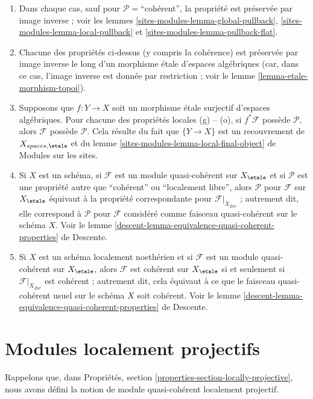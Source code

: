 \begin{enumerate}
\item Dans chaque cas, sauf pour $\mathcal{P}=$``cohérent'', la propriété
est préservée par image inverse ; voir les
lemmes \ref{sites-modules-lemma-global-pullback},
\ref{sites-modules-lemma-local-pullback} et
\ref{sites-modules-lemma-pullback-flat}.
\item Chacune des propriétés ci-dessus (y compris la cohérence) est préservée par
image inverse le long d'un morphisme \'etale d'espaces algébriques (car, dans ce
cas, l'image inverse est donnée par restriction ; voir le
lemme \ref{lemma-etale-morphism-topoi}).
\item Supposons que $f : Y \to X$ soit un morphisme \'etale surjectif d'espaces
algébriques. Pour chacune des propriétés locales (g) -- (o), si
$f^*\mathcal{F}$ possède $\mathcal{P}$, alors $\mathcal{F}$ possède
$\mathcal{P}$. Cela résulte du fait que $\{Y \to X\}$ est un recouvrement de
$X_{spaces, \etale}$ et du
lemme \ref{sites-modules-lemma-local-final-object} de Modules sur les sites.
\item Si $X$ est un schéma, si $\mathcal{F}$ est un module quasi-cohérent
sur $X_\etale$ et si $\mathcal{P}$ est une propriété autre que ``cohérent'' ou
``localement libre'', alors $\mathcal{P}$ pour $\mathcal{F}$ sur $X_\etale$
équivaut à la propriété correspondante pour
$\mathcal{F}|_{X_{Zar}}$ ; autrement dit, elle correspond à $\mathcal{P}$
pour $\mathcal{F}$ considéré comme faisceau quasi-cohérent
sur le schéma $X$. Voir le
lemme \ref{descent-lemma-equivalence-quasi-coherent-properties} de Descente.
\item Si $X$ est un schéma localement noethérien et si $\mathcal{F}$ est un
module quasi-cohérent sur $X_\etale$, alors $\mathcal{F}$
est cohérent sur $X_\etale$ si et seulement si
$\mathcal{F}|_{X_{Zar}}$ est cohérent ; autrement dit, cela équivaut à ce que
le faisceau quasi-cohérent usuel sur le schéma $X$ soit
cohérent. Voir le
lemme \ref{descent-lemma-equivalence-quasi-coherent-properties} de Descente.
\end{enumerate}



\section{Modules localement projectifs}
\label{section-locally-projective}

\noindent
Rappelons que, dans
Propriétés, section \ref{properties-section-locally-projective},
nous avons défini la notion de module quasi-cohérent
localement projectif.

